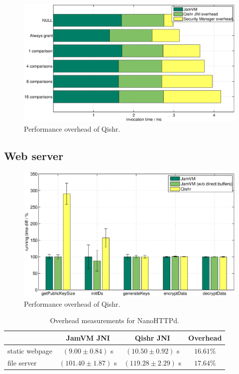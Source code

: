 \documentclass[a4paper,12pt,twoside,openright]{report}
\begin{document}
\begin{figure}
	\centering
	\includegraphics[width=1.1\textwidth]{graph_access.eps}
	\caption{Performance overhead of Qishr.}
\end{figure}


\subsection{Web server}

\begin{figure}
	\centering
	\includegraphics[width=1.1\textwidth]{graph_sodium.eps}
	\caption{Performance overhead of Qishr.}
\end{figure}

\begin{table}
	\centering
	\begin{tabular}{|l|c|c|c|}
		\hline
						& \bf JamVM JNI		& \bf Qishr JNI			& \bf Overhead \\
		\hline
		static webpage		& $(9.00 \pm 0.84)$ s	& $(10.50 \pm 0.92)$ s 	& $16.61\%$ \\
		file server			& $(101.40 \pm 1.87)$ s	& $(119.28 \pm 2.29)$ s 	& $17.64\%$ \\
		\hline
	\end{tabular}
	\caption{Overhead measurements for NanoHTTPd.}
	\label{table:OverheadNanoHTTPd}
\end{table}
\end{document}
